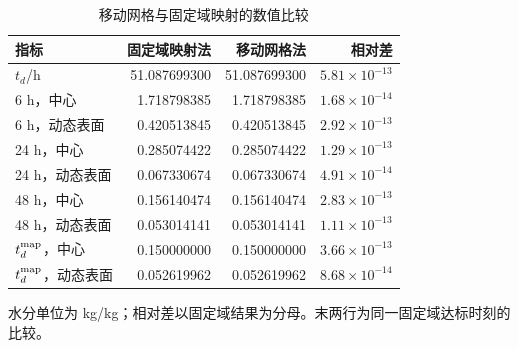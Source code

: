 \begin{table}[!htbp]
\centering
\caption{移动网格与固定域映射的数值比较}\label{tab:q4movingvalidation}
\begin{tabular}{lrrr}
\toprule
指标 & 固定域映射法 & 移动网格法 & 相对差\\
\midrule
$t_d$/h & 51.087699300 & 51.087699300 & $5.81\times10^{-13}$\\
6 h，中心 & 1.718798385 & 1.718798385 & $1.68\times10^{-14}$\\
6 h，动态表面 & 0.420513845 & 0.420513845 & $2.92\times10^{-13}$\\
24 h，中心 & 0.285074422 & 0.285074422 & $1.29\times10^{-13}$\\
24 h，动态表面 & 0.067330674 & 0.067330674 & $4.91\times10^{-14}$\\
48 h，中心 & 0.156140474 & 0.156140474 & $2.83\times10^{-13}$\\
48 h，动态表面 & 0.053014141 & 0.053014141 & $1.11\times10^{-13}$\\
$t_d^{\rm map}$，中心 & 0.150000000 & 0.150000000 & $3.66\times10^{-13}$\\
$t_d^{\rm map}$，动态表面 & 0.052619962 & 0.052619962 & $8.68\times10^{-14}$\\
\bottomrule
\end{tabular}
\par\smallskip
{\footnotesize 水分单位为 kg/kg；相对差以固定域结果为分母。末两行为同一固定域达标时刻的比较。}
\end{table}
